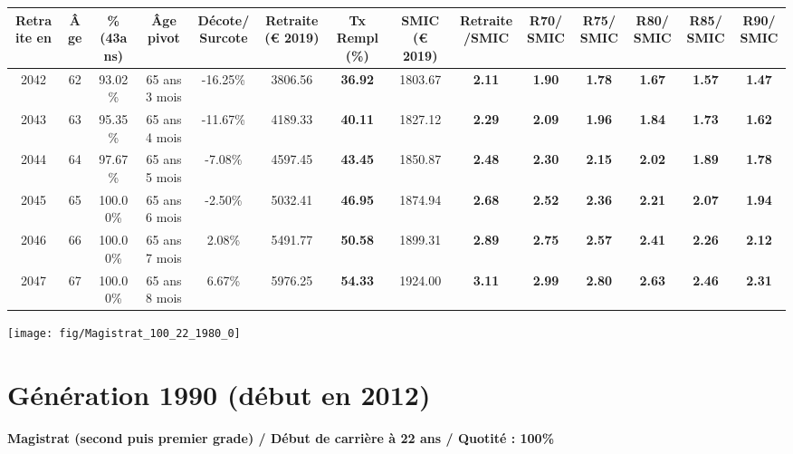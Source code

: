 \begin{adjustbox}{max width=\textwidth} 
\begin{tabular}[htb]{|c|c||c|c|c||c|c||c|c||c|c|c|c|c|} 
\hline 
 Retraite en &  Âge &  \%(43ans) &  Âge pivot &  Décote/Surcote &  Retraite (\euro{} 2019) &  Tx Rempl(\%) &  SMIC (\euro{} 2019) &  Retraite/SMIC &  R70/SMIC &  R75/SMIC &  R80/SMIC &  R85/SMIC &  R90/SMIC \\ 
\hline \hline 
 2042 &  62 &  93.02\% &  65 ans 3 mois &  -16.25\% &  3806.56 &  {\bf 36.92} &  1803.67 &  {\bf 2.11} &  {\bf 1.90} &  {\bf 1.78} &  {\bf 1.67} &  {\bf 1.57} &  {\bf 1.47} \\ 
\hline 
 2043 &  63 &  95.35\% &  65 ans 4 mois &  -11.67\% &  4189.33 &  {\bf 40.11} &  1827.12 &  {\bf 2.29} &  {\bf 2.09} &  {\bf 1.96} &  {\bf 1.84} &  {\bf 1.73} &  {\bf 1.62} \\ 
\hline 
 2044 &  64 &  97.67\% &  65 ans 5 mois &  -7.08\% &  4597.45 &  {\bf 43.45} &  1850.87 &  {\bf 2.48} &  {\bf 2.30} &  {\bf 2.15} &  {\bf 2.02} &  {\bf 1.89} &  {\bf 1.78} \\ 
\hline 
 2045 &  65 &  100.00\% &  65 ans 6 mois &  -2.50\% &  5032.41 &  {\bf 46.95} &  1874.94 &  {\bf 2.68} &  {\bf 2.52} &  {\bf 2.36} &  {\bf 2.21} &  {\bf 2.07} &  {\bf 1.94} \\ 
\hline 
 2046 &  66 &  100.00\% &  65 ans 7 mois &  2.08\% &  5491.77 &  {\bf 50.58} &  1899.31 &  {\bf 2.89} &  {\bf 2.75} &  {\bf 2.57} &  {\bf 2.41} &  {\bf 2.26} &  {\bf 2.12} \\ 
\hline 
 2047 &  67 &  100.00\% &  65 ans 8 mois &  6.67\% &  5976.25 &  {\bf 54.33} &  1924.00 &  {\bf 3.11} &  {\bf 2.99} &  {\bf 2.80} &  {\bf 2.63} &  {\bf 2.46} &  {\bf 2.31} \\ 
\hline 
\hline 
\end{tabular} 
\end{adjustbox} 
 
 \vspace{0.1cm} 

 {\hspace{-2.2cm}\texttt{[image: fig/Magistrat\_100\_22\_1980\_0]}} 

\newpage 
 
\section{Génération 1990 (début en 2012)\label{Magistrat_100_22_1990_0}} 
 
{\bf \noindent Magistrat (second puis premier grade) / Début de carrière à 22 ans / Quotité : 100\%}  ~ 

